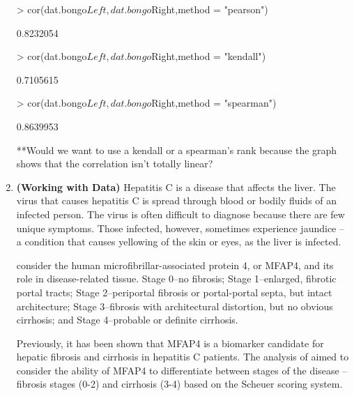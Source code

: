 \documentclass{article}
\begin{document}
\begin{enumerate}
\begin{Schunk}
\begin{Sinput}
> cor(dat.bongo$Left,dat.bongo$Right,method = "pearson")
\end{Sinput}
\begin{Soutput}
[1] 0.8232054
\end{Soutput}
\begin{Sinput}
> cor(dat.bongo$Left,dat.bongo$Right,method = "kendall")
\end{Sinput}
\begin{Soutput}
[1] 0.7105615
\end{Soutput}
\begin{Sinput}
> cor(dat.bongo$Left,dat.bongo$Right,method = "spearman")
\end{Sinput}
\begin{Soutput}
[1] 0.8639953
\end{Soutput}
\end{Schunk}

**Would we want to use a kendall or a spearman's rank because the graph shows that the correlation isn't totally linear?

\item \textbf{(Working with Data)} Hepatitis C is a disease 
    that affects the liver. The virus that causes hepatitis C 
    is spread through blood or bodily fluids of an infected person. 
    The virus is often difficult to diagnose because there are few unique 
    symptoms. Those infected, however, sometimes experience jaundice -- a 
    condition that causes yellowing of the skin or eyes, as the liver 
    is infected.

    \cite{Bracht16} consider the human microfibrillar-associated protein 4,
    or MFAP4, and its role in disease-related tissue. Stage 0--no fibrosis; 
    Stage 1--enlarged, fibrotic portal tracts; Stage 2--periportal fibrosis 
    or portal-portal septa, but intact architecture; Stage 3--fibrosis with
    architectural distortion, but no obvious cirrhosis; and Stage 4--probable
    or definite cirrhosis.

    Previously, it has been shown that MFAP4 is a biomarker candidate for hepatic
    fibrosis and cirrhosis in hepatitis C patients. The analysis of \cite{Bracht16}
    aimed to consider the ability of MFAP4 to differentiate between stages of the 
    disease -- fibrosis stages (0-2) and cirrhosis (3-4) based on the Scheuer 
    scoring system.
    

\end{enumerate}
\end{document}
